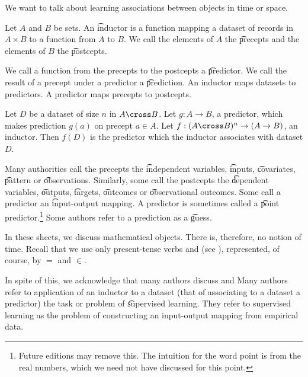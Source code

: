 

We want to talk about learning
associations between objects
in time or space.


Let $A$ and $B$ be sets.
An \t{inductor} is a function mapping a dataset of records in $A \times B$ to a function from $A$ to $B$.
We call the elements of $A$ the \t{precepts} and the elements of $B$ the \t{postcepts}.

We call a function from the precepts to the postcepts a \t{predictor}.
We call the result of a precept under a predictor a \t{prediction}.
An inductor maps datasets to predictors.
A predictor maps precepts to postcepts.


Let $D$ be a dataset of size $n$ in $A \cross B$.
Let $g: A \to B$, a predictor, which makes prediction $g(a)$ on precept $a \in A$.
Let $f: (A \cross B)^n \to (A \to B)$, an inductor.
Then $f(D)$ is the predictor which the inductor associates with dataset $D$.


Many authorities call the precepts the \t{independent variables}, \t{inputs}, \t{covariates}, \t{pattern} or \t{observations}.
Similarly, some call the postcepts the \t{dependent variables}, \t{outputs}, \t{targets}, \t{outcomes} or \t{observational outcomes}.
Some call a predictor an \t{input-output} mapping.
A predictor is sometimes called a \t{point predictor}.\footnote{Future editions may remove this. The intuition for the word point is from the real numbers, which we need not have discussed for this point.}
Some authors refer to a prediction as a \t{guess}.


In these sheets, we discuss mathematical objects.
There is, therefore, no notion of time.
Recall that we use only present-tense verbs  and  (see ), represented, of course, by $=$ and $\in$.

In spite of this, we acknowledge that many authors discuss   and 
Many authors refer to application of an inductor to a dataset (that of associating to a dataset a predictor) the task or problem of \t{supervised learning}.
They refer to supervised learning as the problem of constructing an input-output mapping from empirical data.

\blankpage

